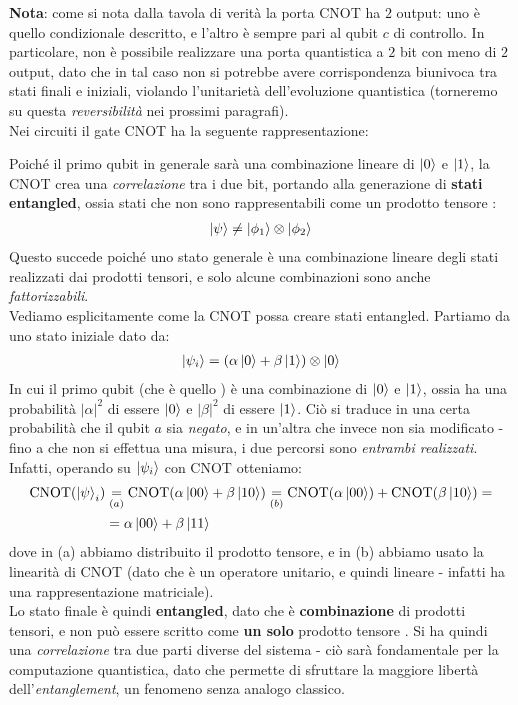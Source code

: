 \documentclass[../../InformazioneQuantistica.tex]{subfiles}
\begin{document}
\textbf{Nota}: come si nota dalla tavola di verità la porta CNOT ha $2$ output: uno è quello condizionale descritto, e l'altro è sempre pari al qubit $c$ di controllo. In particolare, non è possibile realizzare una porta quantistica a $2$ bit con meno di $2$ output, dato che in tal caso non si potrebbe avere corrispondenza biunivoca tra stati finali e iniziali, violando l'unitarietà dell'evoluzione quantistica (torneremo su questa \textit{reversibilità} nei prossimi paragrafi).\\

Nei circuiti il gate CNOT ha la seguente rappresentazione:



Poiché il primo qubit in generale sarà una combinazione lineare di $\Ket{0}$ e $\Ket{1}$, la CNOT crea una \textit{correlazione} tra i due bit, portando alla generazione di \textbf{stati entangled}, ossia stati che non sono rappresentabili come un prodotto tensore :
\begin{align*}
\Ket{\psi} \neq \Ket{\phi_1} \otimes \Ket{\phi_2}
\end{align*}
Questo succede poiché uno stato generale è una combinazione lineare degli stati realizzati dai prodotti tensori, e solo alcune combinazioni sono anche \textit{fattorizzabili}.\\


Vediamo esplicitamente come la CNOT possa creare stati entangled. Partiamo da uno stato iniziale dato da:
\begin{align*}
\Ket{\psi_i} = \left(\alpha\Ket{0} + \beta\Ket{1}\right) \otimes \Ket{0}
\end{align*}
In cui il primo qubit (che è quello ) è una combinazione di $\Ket{0}$ e $\Ket{1}$, ossia ha una probabilità $|\alpha|^2$ di essere $\Ket{0}$ e $|\beta|^2$ di essere $\Ket{1}$. Ciò si traduce in una certa probabilità che il qubit $a$ sia \textit{negato}, e in un'altra che invece non sia modificato - fino a che non si effettua una misura, i due percorsi sono \textit{entrambi realizzati}. Infatti, operando su $\Ket{\psi_i}$ con CNOT otteniamo:
\begin{align*}
\operatorname{CNOT}(\Ket{\psi}_i) &\underset{(a)}{=} \operatorname{CNOT}(\alpha \Ket{00} + \beta \Ket{10}) \underset{(b)}{=} \operatorname{CNOT}(\alpha \Ket{00}) + \operatorname{CNOT}(\beta \Ket{10}) =\\
&= \alpha \Ket{00} + \beta \Ket{11}
\end{align*}
dove in (a) abbiamo distribuito il prodotto tensore, e in (b) abbiamo usato la linearità di CNOT (dato che è un operatore unitario, e quindi lineare - infatti  ha una rappresentazione matriciale).\\
Lo stato finale è quindi \textbf{entangled}, dato che è \textbf{combinazione} di prodotti tensori, e non può essere scritto come \textbf{un solo} prodotto tensore . Si ha quindi una \textit{correlazione} tra due parti diverse del sistema - ciò sarà fondamentale per la computazione quantistica, dato che permette di sfruttare la maggiore libertà dell'\textit{entanglement}, un fenomeno senza analogo classico.\\
\end{document}

